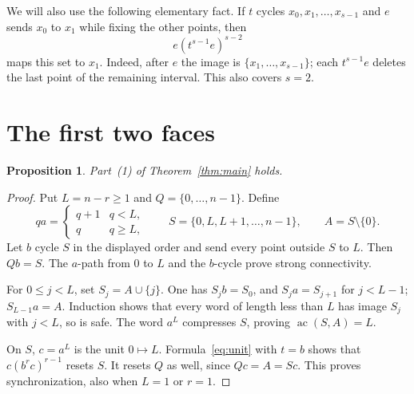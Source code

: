 \documentclass[10pt]{article}
\newtheorem{proposition}[theorem]{Proposition}
\newcommand{\ac}{\operatorname{ac}}
\begin{document}
We will also use the following elementary fact. If $t$ cycles $x_0,x_1,\ldots,x_{s-1}$ and $e$ sends $x_0$ to $x_1$ while fixing the other points, then
\begin{equation}\label{eq:unit}
 e(t^{s-1}e)^{s-2}
\end{equation}
maps this set to $x_1$. Indeed, after $e$ the image is $\{x_1,\ldots,x_{s-1}\}$; each $t^{s-1}e$ deletes the last point of the remaining interval. This also covers $s=2$.

\section{The first two faces}
\begin{proposition}\label{prop:one}
Part~(1) of Theorem~\ref{thm:main} holds.
\end{proposition}
\begin{proof}
Put $L=n-r\ge1$ and $Q=\{0,\ldots,n-1\}$. Define
\[
 qa=\begin{cases}q+1&q<L,\\q&q\ge L,\end{cases}
 \qquad S=\{0,L,L+1,\ldots,n-1\},\qquad A=S\setminus\{0\}.
\]
Let $b$ cycle $S$ in the displayed order and send every point outside $S$ to $L$. Then $Qb=S$. The $a$-path from $0$ to $L$ and the $b$-cycle prove strong connectivity.

For $0\le j<L$, set $S_j=A\cup\{j\}$. One has $S_jb=S_0$, and $S_ja=S_{j+1}$ for $j<L-1$; $S_{L-1}a=A$. Induction shows that every word of length less than $L$ has image $S_j$ with $j<L$, so is safe. The word $a^L$ compresses $S$, proving $\ac(S,A)=L$.

On $S$, $c=a^L$ is the unit $0\mapsto L$. Formula~\eqref{eq:unit} with $t=b$ shows that $c(b^rc)^{r-1}$ resets $S$. It resets $Q$ as well, since $Qc=A=Sc$. This proves synchronization, also when $L=1$ or $r=1$.
\end{proof}
\end{document}
